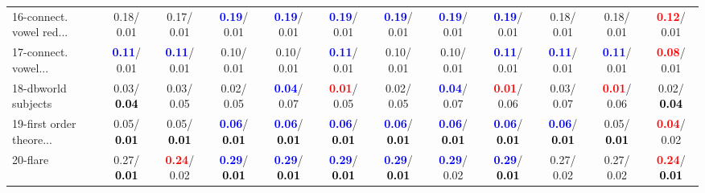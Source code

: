 \begin{table}[h]
\begin{center}
{\begin{tabular}{lc|c|c|c|c|c|c|c|c|c|c}
16-connect. vowel red... &   0.18/  0.01 &   0.17/  0.01 & \textcolor{blue}{\textbf{  0.19}}/  0.01 & \textcolor{blue}{\textbf{  0.19}}/  0.01 & \textcolor{blue}{\textbf{  0.19}}/  0.01 & \textcolor{blue}{\textbf{  0.19}}/  0.01 & \textcolor{blue}{\textbf{  0.19}}/  0.01 & \textcolor{blue}{\textbf{  0.19}}/  0.01 &   0.18/  0.01 &   0.18/  0.01 & \textcolor{red}{\textbf{  0.12}}/  0.01 \\
17-connect. vowel... & \textcolor{blue}{\textbf{  0.11}}/  0.01 & \textcolor{blue}{\textbf{  0.11}}/  0.01 &   0.10/  0.01 &   0.10/  0.01 & \textcolor{blue}{\textbf{  0.11}}/  0.01 &   0.10/  0.01 &   0.10/  0.01 & \textcolor{blue}{\textbf{  0.11}}/  0.01 & \textcolor{blue}{\textbf{  0.11}}/  0.01 & \textcolor{blue}{\textbf{  0.11}}/  0.01 & \textcolor{red}{\textbf{  0.08}}/  0.01 \\
18-dbworld subjects &   0.03/\textcolor{black}{\textbf{  0.04}} &   0.03/  0.05 &   0.02/  0.05 & \textcolor{blue}{\textbf{  0.04}}/  0.07 & \textcolor{red}{\textbf{  0.01}}/  0.05 &   0.02/  0.05 & \textcolor{blue}{\textbf{  0.04}}/  0.07 & \textcolor{red}{\textbf{  0.01}}/  0.06 &   0.03/  0.07 & \textcolor{red}{\textbf{  0.01}}/  0.06 &   0.02/\textcolor{black}{\textbf{  0.04}} \\
19-first order theore... &   0.05/\textcolor{black}{\textbf{  0.01}} &   0.05/\textcolor{black}{\textbf{  0.01}} & \textcolor{blue}{\textbf{  0.06}}/\textcolor{black}{\textbf{  0.01}} & \textcolor{blue}{\textbf{  0.06}}/\textcolor{black}{\textbf{  0.01}} & \textcolor{blue}{\textbf{  0.06}}/\textcolor{black}{\textbf{  0.01}} & \textcolor{blue}{\textbf{  0.06}}/\textcolor{black}{\textbf{  0.01}} & \textcolor{blue}{\textbf{  0.06}}/\textcolor{black}{\textbf{  0.01}} & \textcolor{blue}{\textbf{  0.06}}/\textcolor{black}{\textbf{  0.01}} & \textcolor{blue}{\textbf{  0.06}}/\textcolor{black}{\textbf{  0.01}} &   0.05/\textcolor{black}{\textbf{  0.01}} & \textcolor{red}{\textbf{  0.04}}/  0.02 \\
20-flare &   0.27/\textcolor{black}{\textbf{  0.01}} & \textcolor{red}{\textbf{  0.24}}/  0.02 & \textcolor{blue}{\textbf{  0.29}}/\textcolor{black}{\textbf{  0.01}} & \textcolor{blue}{\textbf{  0.29}}/\textcolor{black}{\textbf{  0.01}} & \textcolor{blue}{\textbf{  0.29}}/\textcolor{black}{\textbf{  0.01}} & \textcolor{blue}{\textbf{  0.29}}/\textcolor{black}{\textbf{  0.01}} & \textcolor{blue}{\textbf{  0.29}}/  0.02 & \textcolor{blue}{\textbf{  0.29}}/\textcolor{black}{\textbf{  0.01}} &   0.27/  0.02 &   0.27/  0.02 & \textcolor{red}{\textbf{  0.24}}/\textcolor{black}{\textbf{  0.01}} \\

\end{tabular}}
\end{center}
\end{table}
